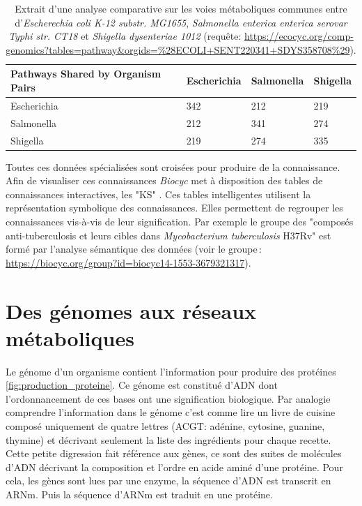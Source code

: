\begin{refsegment}
    \begin{table}[H]
    	\caption{Extrait d'une analyse comparative sur les voies métaboliques communes entre d'\textit{Escherechia coli K-12 substr. MG1655}, \textit{Salmonella enterica enterica serovar Typhi str. CT18} et \textit{Shigella dysenteriae 1012} (requête: \url{https://ecocyc.org/comp-genomics?tables=pathway&orgids=\%28ECOLI+SENT220341+SDYS358708\%29}). }
    	\label{tab:compare_tools} 
    	\begin{tabular}{l|lll}
    		\toprule
    		Pathways Shared by Organism Pairs & Escherichia & Salmonella & Shigella \\
    		\midrule
    		Escherichia                       & 342         & 212        & 219      \\           
    		Salmonella                        & 212         & 341        & 274      \\           
    		Shigella                          & 219         & 274        & 335      \\ 
    		\bottomrule
    	\end{tabular}
    \end{table}
    
    
    Toutes ces données spécialisées sont croisées pour produire de la connaissance. Afin de visualiser ces connaissances \textit{Biocyc} met à disposition des tables de connaissances interactives, les "\acrfull{KS}" \cite{bat061SmartTable}. Ces tables intelligentes utilisent la représentation symbolique des connaissances. Elles permettent de regrouper les connaissances vis-à-vis de leur signification. Par exemple le groupe des "composés anti-tuberculosis  et leurs cibles dans  \textit{Mycobacterium tuberculosis} H37Rv" est formé par l'analyse sémantique des données (voir le groupe : \url{https://biocyc.org/group?id=biocyc14-1553-3679321317}).
    
    
    
    
    \section{Des génomes aux réseaux métaboliques}
    
    Le génome d'un organisme contient l'information pour produire des protéines \ref{fig:production_proteine}. Ce génome est constitué d'\gls{ADN} dont l'ordonnancement de ces bases ont une signification biologique. Par analogie comprendre l'information dans le génome c'est comme lire un livre de cuisine composé uniquement de quatre lettres (ACGT: adénine, cytosine, guanine, thymine) et décrivant seulement la liste des ingrédients pour chaque recette. Cette petite digression fait référence aux gènes, ce sont des suites de molécules d'\gls{ADN} décrivant la composition et l'ordre en acide aminé d'une protéine. Pour cela, les gènes sont lues par une enzyme, la séquence d'\gls{ADN} est transcrit en \gls{ARNm}. Puis la séquence d'{ARNm} est traduit en une protéine.
     

\end{refsegment}
